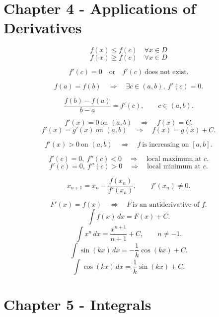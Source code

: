 
\section*{Chapter 4 - Applications of Derivatives}

\[
  f(x)\le f(c)\quad\forall x\in D
\]
\[
  f(x)\ge f(c)\quad\forall x\in D
\]

\[
  f'(c)=0 \quad\text{or}\quad f'(c)\ \text{does not exist}.
\]

\[
  f(a)=f(b)
  \quad\Longrightarrow\quad
  \exists c\in(a,b),\ f'(c)=0.
\]

\[
  \frac{f(b)-f(a)}{b-a}=f'(c),
  \qquad c\in(a,b).
\]

\[
  f'(x)=0\ \text{on }(a,b)
  \quad\Longrightarrow\quad
  f(x)=C.
\]
\[
  f'(x)=g'(x)\ \text{on }(a,b)
  \quad\Longrightarrow\quad
  f(x)=g(x)+C.
\]

\[
  f'(x)>0\ \text{on }(a,b)
  \quad\Longrightarrow\quad
  f\ \text{is increasing on }[a,b].
\]

\[
  f'(c)=0,\ f''(c)<0
  \quad\Longrightarrow\quad
  \text{local maximum at }c.
\]
\[
  f'(c)=0,\ f''(c)>0
  \quad\Longrightarrow\quad
  \text{local minimum at }c.
\]

\[
  x_{n+1}=x_n-\frac{f(x_n)}{f'(x_n)},
  \qquad f'(x_n)\ne0.
\]

\[
  F'(x)=f(x)
  \quad\Longleftrightarrow\quad
  F\ \text{is an antiderivative of }f.
\]
\[
  \int f(x)\,dx=F(x)+C.
\]
\[
  \int x^n\,dx=\frac{x^{n+1}}{n+1}+C,
  \qquad n\ne-1.
\]
\[
  \int \sin(kx)\,dx=-\frac{1}{k}\cos(kx)+C.
\]
\[
  \int \cos(kx)\,dx=\frac{1}{k}\sin(kx)+C.
\]

\section*{Chapter 5 - Integrals}

